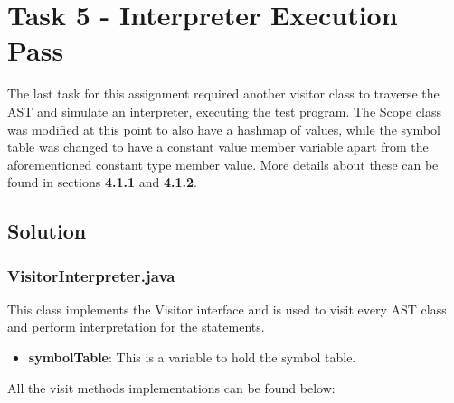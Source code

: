 \documentclass{article}
\begin{document}
			
			\section{Task 5 - Interpreter Execution Pass}
			
			The last task for this assignment required another visitor class to traverse the AST and simulate an interpreter, executing the test program. The Scope class was modified at this point to also have a hashmap of values, while the symbol table was changed to have a constant value member variable apart from the aforementioned constant type member value. More details about these can be found in sections \textbf{4.1.1}
and \textbf{4.1.2}. 			

		\subsection{Solution}
		
		\subsubsection{VisitorInterpreter.java}
		
		This class implements the Visitor interface and is used to visit every AST class and perform interpretation for the statements. 
			
					\begin{itemize}
			\item \textbf{symbolTable}: This is a variable to hold the symbol table.
			
		
			\end{itemize}
			
			\noindent All the visit methods implementations can be found below:
			
\end{document}
